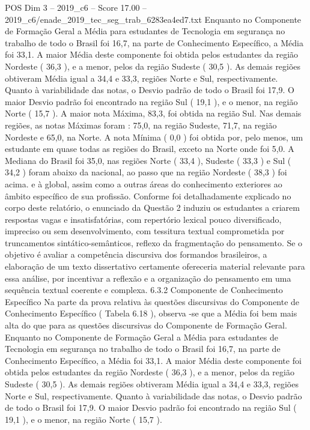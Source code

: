 \begin{textsample}{POS Dim 3 – 2019\_c6 – Score 17.00 – 2019\_c6/enade\_2019\_tec\_seg\_trab\_6283ea4ed7.txt}
Enquanto no Componente de Formação Geral a Média para estudantes de Tecnologia em segurança no trabalho de todo o Brasil foi 16,7, na parte de Conhecimento Específico, a Média foi 33,1.
A maior Média deste componente foi obtida pelos estudantes da região Nordeste ( 36,3 ), e a menor, pelos da região Sudeste ( 30,5 ).
As demais regiões obtiveram Média igual a 34,4 e 33,3, regiões Norte e Sul, respectivamente.
Quanto à variabilidade das notas, o Desvio padrão de todo o Brasil foi 17,9.
O maior Desvio padrão foi encontrado na região Sul ( 19,1 ), e o menor, na região Norte ( 15,7 ).
A maior nota Máxima, 83,3, foi obtida na região Sul.
Nas demais regiões, as notas Máximas foram : 75,0, na região Sudeste, 71,7, na região Nordeste e 65,0, na Norte.
A nota Mínima ( 0,0 ) foi obtida por, pelo menos, um estudante em quase todas as regiões do Brasil, exceto na Norte onde foi 5,0.
A Mediana do Brasil foi 35,0, nas regiões Norte ( 33,4 ), Sudeste ( 33,3 ) e Sul ( 34,2 ) foram abaixo da nacional, ao passo que na região Nordeste ( 38,3 ) foi acima. e à global, assim como a outras áreas do conhecimento exteriores ao âmbito específico de sua profissão.
Conforme foi detalhadamente explicado no corpo deste relatório, o enunciado da Questão 2 induziu os estudantes a criarem respostas vagas e insatisfatórias, com repertório lexical pouco diversificado, impreciso ou sem desenvolvimento, com tessitura textual comprometida por truncamentos sintático-semânticos, reflexo da fragmentação do pensamento.
Se o objetivo é avaliar a competência discursiva dos formandos brasileiros, a elaboração de um texto dissertativo certamente ofereceria material relevante para essa análise, por incentivar a reflexão e a organização do pensamento em uma sequência textual coerente e complexa. 6.3.2 Componente de Conhecimento Específico Na parte da prova relativa às questões discursivas do Componente de Conhecimento Específico ( Tabela 6.18 ), observa -se que a Média foi bem mais alta do que para as questões discursivas do Componente de Formação Geral.
Enquanto no Componente de Formação Geral a Média para estudantes de Tecnologia em segurança no trabalho de todo o Brasil foi 16,7, na parte de Conhecimento Específico, a Média foi 33,1.
A maior Média deste componente foi obtida pelos estudantes da região Nordeste ( 36,3 ), e a menor, pelos da região Sudeste ( 30,5 ).
As demais regiões obtiveram Média igual a 34,4 e 33,3, regiões Norte e Sul, respectivamente.
Quanto à variabilidade das notas, o Desvio padrão de todo o Brasil foi 17,9.
O maior Desvio padrão foi encontrado na região Sul ( 19,1 ), e o menor, na região Norte ( 15,7 ).

\end{textsample}
